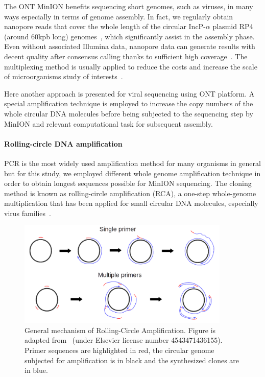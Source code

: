The ONT MinION benefits sequencing short genomes, such as viruses, in many ways especially in terms of genome assembly. 
In fact, we regularly obtain nanopore reads that cover the whole length of the circular IncP-$\alpha$ plasmid RP4 (around $60$kpb long) genomes~\cite{Lu2018plamids}, which significantly assist in the assembly phase.   
Even without associated Illumina data, nanopore data can generate results with decent quality after consensus calling thanks to sufficient high coverage~\cite{Vaser2017racon}.
The multiplexing method is usually applied to reduce the costs and increase the scale of microorganisms study of interests~\cite{Quick2017GP}.

Here another approach is presented for viral sequencing using ONT platform. A special amplification technique is employed to increase the copy numbers of the whole circular DNA molecules before being subjected to the sequencing step by MinION and relevant computational task for subsequent assembly.

\paragraph{Rolling-circle DNA amplification}
PCR is the most widely used amplification method for many organisms in general but for this study, we employed different whole genome amplification technique in order to obtain longest sequences possible for MinION sequencing.
The cloning method is known as rolling-circle amplification (RCA), a one-step whole-genome multiplication that has been applied for small circular DNA molecules, especially virus families~\cite{Rector2004rca14,Inoue2004rca28,Schubert2007rca30,Knierim200rca31,Shepherd2008rca32,Haible2006rca33,Homs2008rca34}.

\begin{figure}[!hpt]
\centerline{\includegraphics[width=0.9\textwidth]{images/rca.png}}
\caption[Rolling Circle Amplification]{General mechanism of Rolling-Circle Amplification. Figure is adapted from~\cite{Johne2009rca} (under Elsevier license number 4543471436155). Primer sequences are highlighted in red, the circular genome subjected for amplification is in black and the synthesized clones are in blue.}
\label{fig:concat_rca}
\end{figure}

